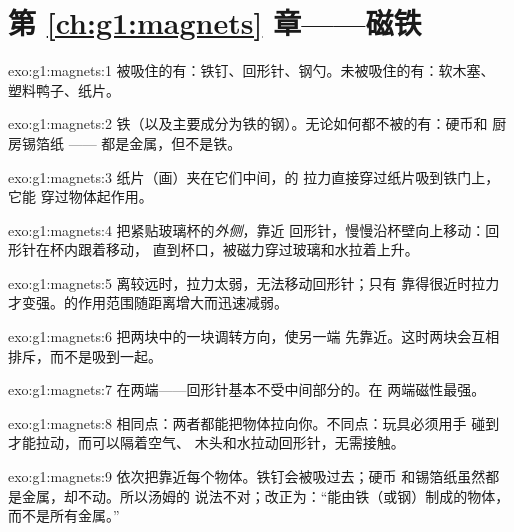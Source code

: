 \section*{第 \ref{ch:g1:magnets} 章——磁铁}

\begin{solution}{exo:g1:magnets:1}
被吸住的有：铁钉、回形针、钢勺。未被吸住的有：软木塞、
塑料鸭子、纸片。
\end{solution}

\begin{solution}{exo:g1:magnets:2}
铁（以及主要成分为铁的钢）。无论如何都不被的有：硬币和
厨房锡箔纸 —— 都是金属，但不是铁。
\end{solution}

\begin{solution}{exo:g1:magnets:3}
纸片（画）夹在它们中间，的
拉力直接穿过纸片吸到铁门上，它能
穿过物体起作用。
\end{solution}

\begin{solution}{exo:g1:magnets:4}
把紧贴玻璃杯的\emph{外侧}，靠近
回形针，慢慢沿杯壁向上移动：回形针在杯内跟着移动，
直到杯口，被磁力穿过玻璃和水拉着上升。
\end{solution}

\begin{solution}{exo:g1:magnets:5}
离较远时，拉力太弱，无法移动回形针；只有
靠得很近时拉力才变强。的作用范围随距离增大而迅速减弱。
\end{solution}

\begin{solution}{exo:g1:magnets:6}
把两块中的一块调转方向，使另一端
先靠近。这时两块会互相排斥，而不是吸到一起。
\end{solution}

\begin{solution}{exo:g1:magnets:7}
在两端——回形针基本不受中间部分的。在
两端磁性最强。
\end{solution}

\begin{solution}{exo:g1:magnets:8}
相同点：两者都能把物体拉向你。不同点：玩具必须用手
碰到才能拉动，而可以隔着空气、
木头和水拉动回形针，无需接触。
\end{solution}

\begin{solution}{exo:g1:magnets:9}
依次把靠近每个物体。铁钉会被吸过去；硬币
和锡箔纸虽然都是金属，却不动。所以汤姆的
说法不对；改正为：“能由铁（或钢）制成的物体，
而不是所有金属。”
\end{solution}
